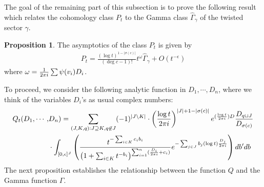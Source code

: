 \documentclass[11pt,reqno]{amsart}
\theoremstyle{definition}
\newtheorem{proposition}[theorem]{Proposition}
\numberwithin{equation}{section}
\begin{document}
\smallskip

The goal of the remaining part of this subsection is to prove the following result which relates the cohomology class $P_t$ to the Gamma class $\hat{\Gamma}_{\gamma}$ of the twisted sector $\gamma$.
\begin{proposition}\label{equality of cohomology classes}
The asymptotics of the class $P_t$ is given by
\begin{align*}
	P_t=\frac{(\log t)^{1-|\sigma(c)|}}{(\deg c-1)!}t^{\omega}\widehat{\Gamma}_{\gamma}+O(t^{-\epsilon})
\end{align*}
	where $\omega=\frac{1}{2\pi{\rm i}}\sum\psi(v_i)D_i$.
\end{proposition}

\smallskip

To proceed, we consider the following analytic function in $D_1,\cdots, D_n$, where we think of the variables $D_i$'s as usual complex numbers:
\begin{align*}
	Q_t(D_1,\cdots,&D_n)=\sum_{(J,K,q):J\supseteq K,q\not\in J}(-1)^{|J\backslash K|}\cdot\left(\frac{\log t}{2\pi{\rm i}}\right)^{|J|+1-|\sigma(c)|}e^{(\frac{\log t}{2\pi {\rm i}}) D}\frac{D_{q\sqcup J}}{D_{\sigma(c)}}\\
	&\cdot\int_{[0,\epsilon]^J}\left(\frac{t^{-\sum_{i\in K}c_ib_i}}{\left(1+\sum_{i\in K}t^{-b_i}\right)^{\sum_{i=1}^n(\frac{D_i}{2\pi{\rm i}}+c_i)}}e^{-\sum_{j\in J}b_j (\log t)\frac{D_j}{2\pi{\rm i}}}\right)db^{\prime}db
\end{align*}
The next proposition establishes the relationship between the function $Q$ and the Gamma function $\Gamma$.

\smallskip
\end{document}
